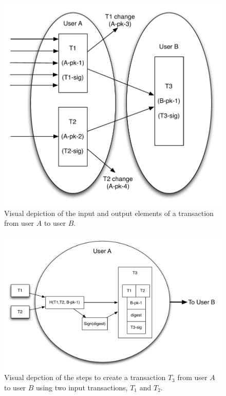\begin{center}
\begin{figure}
\includegraphics[scale=0.5]{./images/transaction_io.pdf}
\caption{Visual depiction of the input and output elements of a transaction from user $A$ to user $B$.}
\label{fig:transaction-io}
\end{figure}
\end{center}

\begin{center}
\begin{figure}
\includegraphics[scale=0.4]{./images/transaction_create.pdf}
\caption{Visual depction of the steps to create a transaction $T_3$ from user $A$ to user $B$ using two input transactions, $T_1$ and $T_2$.}
\label{fig:transaction-create}
\end{figure}
\end{center}

